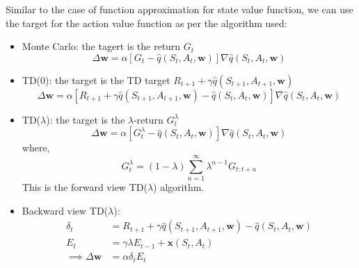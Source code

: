 Similar to the case of function approximation for state value function, we can use the target
for the action value function as per the algorithm used:
\begin{itemize}
    \item Monte Carlo: the tagert is the return \(G_t\)
    \[
        \Delta \mathbf{w} = \alpha \left[ 
            G_t - \hat{q}(S_t,A_t,\mathbf{w})
         \right] \nabla \hat{q}(S_t,A_t,\mathbf{w})  
    \]
    \item TD(0): the target is the TD target \(R_{t+1} + \gamma \hat{q}(S_{t+1},A_{t+1},
    \mathbf{w})\)
    \[
        \Delta \mathbf{w} = \alpha \left[ 
            R_{t+1} + \gamma \hat{q}(S_{t+1},A_{t+1},\mathbf{w}) - \hat{q}(S_t,A_t,
            \mathbf{w})
         \right] \nabla \hat{q}(S_t,A_t,\mathbf{w})
    \]
    \item TD(\(\lambda\)): the target is the \(\lambda\)-return  \(G_t^{\lambda}\)
    \[
        \Delta \mathbf{w} = \alpha \left[ 
            G_t^{\lambda} - \hat{q}(S_t,A_t,\mathbf{w})
         \right] \nabla \hat{q}(S_t,A_t,\mathbf{w})
    \]
    where,
    \[
        G_t^{\lambda} = (1-\lambda) \sum_{n=1}^{\infty} \lambda^{n-1} G_{t:t+n}  
    \]
    This is the forward view TD(\(\lambda\)) algorithm.

    \item Backward view TD(\(\lambda\)):
    \[
        \begin{aligned}
            \delta _t &= R_{t+1} + \gamma \hat{q}(S_{t+1},A_{t+1},\mathbf{w}) - \hat{q}(S_t,
            A_t,\mathbf{w}) \\
            E_t &= \gamma \lambda E_{t-1} + \mathbf{x}(S_t,A_t) \\
            \implies \Delta \mathbf{w} &= \alpha \delta_t E_t
        \end{aligned}
    \]
\end{itemize}

